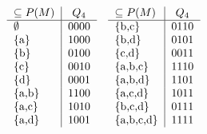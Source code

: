 \documentclass[a4paper]{scrartcl}
\begin{document}
		\[
		\begin{tabular}{l|c}
			\(\subseteq P(M)\)&\(Q_4\) \\ \hline
			\(\emptyset\) & 0000\\
			\{a\} & 1000\\
			\{b\} & 0100\\
			\{c\} & 0010\\
			\{d\} & 0001\\
			\{a,b\} & 1100\\
			\{a,c\} & 1010\\
			\{a,d\} & 1001\\
		\end{tabular} \quad
		\begin{tabular}{l|c}
			\(\subseteq P(M)\)&\(Q_4\) \\ \hline
			\{b,c\} & 0110\\
			\{b,d\} & 0101\\
			\{c,d\} & 0011\\
			\{a,b,c\} & 1110\\
			\{a,b,d\} & 1101\\
			\{a,c,d\} & 1011\\
			\{b,c,d\} & 0111\\
			\{a,b,c,d\} & 1111\\
		\end{tabular}
		\]
\end{document}
